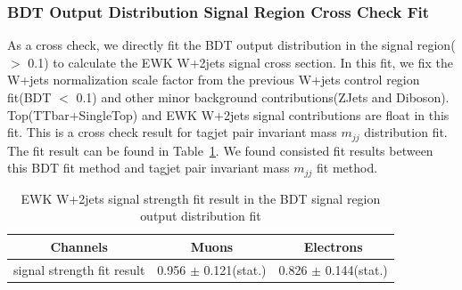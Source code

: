 \subsubsection{BDT Output Distribution Signal Region Cross Check Fit}
As a cross check, we directly fit the BDT output distribution in the signal region($>$ 0.1) to calculate the EWK W+2jets signal cross section. In this fit, we fix the W+jets normalization scale factor from the previous W+jets control region fit(BDT $<$ 0.1) and other minor background contributions(ZJets and Diboson). Top(TTbar+SingleTop) and EWK W+2jets signal contributions are float in this fit. This is a cross check result for tagjet pair invariant mass $m_{jj}$ distribution fit. The fit result can be found in Table~\ref{tab:bdtfitresult}. We found consisted fit results between this BDT fit method and tagjet pair invariant mass $m_{jj}$ fit method.

\begin{table}[htb]
\centering
\begin{tabular}{|c|c|c|}
\hline
Channels &  Muons & Electrons \\ \hline
signal strength fit result & 0.956 $\pm$ 0.121(stat.) & 0.826 $\pm$ 0.144(stat.) \\ \hline
\end{tabular}
\caption{EWK W+2jets signal strength fit result in the BDT signal region output distribution fit}
\label{tab:bdtfitresult}
\end{table}


